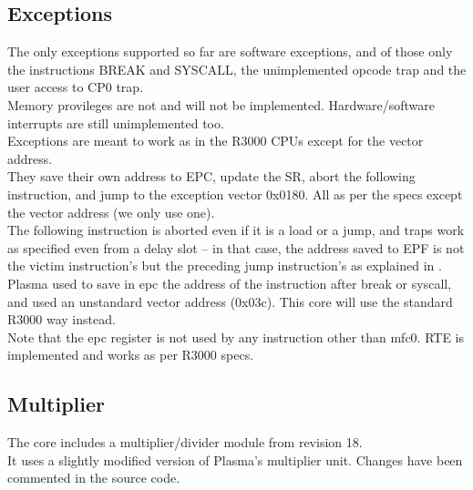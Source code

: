 \documentclass[11pt]{article}
\begin{document}
    
\subsection{Exceptions}
\label{exceptions}

    The only exceptions supported so far are software exceptions, and of those 
    only the instructions BREAK and SYSCALL, the unimplemented opcode trap and
    the user access to CP0 trap.\\
    Memory provileges are not and will not be implemented. Hardware/software 
    interrupts are still unimplemented too.\\
    
    Exceptions are meant to work as in the R3000 CPUs except for the vector 
    address.\\
    They save their own address to EPC, update the SR, abort the following 
    instruction, and jump to the exception vector 0x0180. All as per the specs 
    except the vector address (we only use one).\\
        
    The following instruction is aborted even if it is a load or a jump, and 
    traps work as specified even from a delay slot -- in that case, the address
    saved to EPF is not the victim instruction's but the preceding jump 
    instruction's as explained in \cite[p.~64]{see_mips_run}.\\
    
    Plasma used to save in epc the address of the instruction after break or 
    syscall, and used an unstandard vector address (0x03c). This core will use 
    the standard R3000 way instead.\\
    
    Note that the epc register is not used by any instruction other than mfc0.
    RTE is implemented and works as per R3000 specs.\\


\subsection{Multiplier}
\label{multiplier}

    The core includes a multiplier/divider module from revision 18.\\
    
    It uses a slightly modified version of Plasma's multiplier unit. Changes
    have been commented in the source code.\\
    
\end{document}
